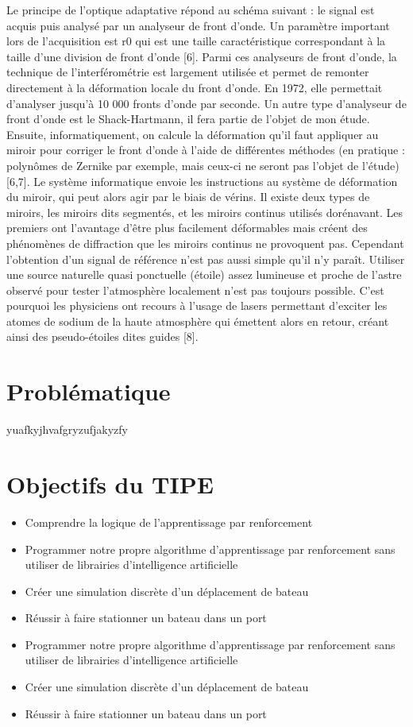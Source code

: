 \documentclass[12pt,a4paper]{extarticle}
\begin{document}
Le principe de l’optique adaptative répond au schéma suivant : le signal est acquis
puis analysé par un analyseur de front d’onde. Un paramètre important lors de l’acquisition
est r0 qui est une taille caractéristique correspondant à la taille d’une division de front
d’onde [6].
Parmi ces analyseurs de front d’onde, la technique de l’interférométrie est
largement utilisée et permet de remonter directement à la déformation locale du front
d’onde. En 1972, elle permettait d’analyser jusqu’à 10 000 fronts d’onde par seconde.
Un autre type d’analyseur de front d’onde est le Shack-Hartmann, il fera partie de
l’objet de mon étude.
Ensuite, informatiquement, on calcule la déformation qu’il faut appliquer au miroir
pour corriger le front d’onde à l’aide de différentes méthodes (en pratique : polynômes de
Zernike par exemple, mais ceux-ci ne seront pas l’objet de l’étude) [6,7]. Le système
informatique envoie les instructions au système de déformation du miroir, qui peut alors
agir par le biais de vérins.
Il existe deux types de miroirs, les miroirs dits segmentés, et les miroirs continus
utilisés dorénavant. Les premiers ont l’avantage d’être plus facilement déformables mais
créent des phénomènes de diffraction que les miroirs continus ne provoquent pas.
Cependant l’obtention d’un signal de référence n’est pas aussi simple qu’il n’y paraît.
Utiliser une source naturelle quasi ponctuelle (étoile) assez lumineuse et proche de l’astre
observé pour tester l’atmosphère localement n’est pas toujours possible. C’est pourquoi les
physiciens ont recours à l’usage de lasers permettant d’exciter les atomes de sodium de la
haute atmosphère qui émettent alors en retour, créant ainsi des pseudo-étoiles dites guides
[8].
 
\section*{Problématique}

\indent yuafkyjhvafgryzufjakyzfy

\section*{Objectifs du TIPE}

\begin{itemize}

\item Comprendre la logique de l'apprentissage par renforcement
\item Programmer notre propre algorithme d'apprentissage par renforcement sans utiliser de librairies d'intelligence artificielle
\item Créer une simulation discrète d'un déplacement de bateau
\item Réussir à faire stationner un bateau dans un port
\item Programmer notre propre algorithme d'apprentissage par renforcement sans utiliser de librairies d'intelligence artificielle
\item Créer une simulation discrète d'un déplacement de bateau
\item Réussir à faire stationner un bateau dans un port

\end{itemize}
\end{document}
